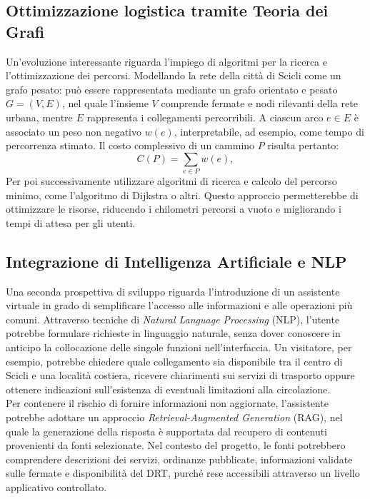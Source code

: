 \subsection*{Ottimizzazione logistica tramite Teoria dei Grafi}
Un'evoluzione interessante riguarda l'impiego di algoritmi per la ricerca e l'ottimizzazione dei percorsi. Modellando la rete della città di Scicli come un grafo pesato: può essere rappresentata mediante un grafo orientato e pesato $G=(V,E)$, nel quale l'insieme $V$ comprende fermate e nodi rilevanti della rete urbana, mentre $E$ rappresenta i collegamenti percorribili. A ciascun arco $e\in E$ è associato un peso non negativo $w(e)$, interpretabile, ad esempio, come tempo di percorrenza stimato. Il costo complessivo di un cammino $P$ risulta pertanto:
\begin{equation}
    C(P)=\sum_{e\in P} w(e),
    \label{eq:costo_percorso}
\end{equation}
\vspace{1em}
Per poi successivamente utilizzare algoritmi di ricerca e calcolo del percorso minimo, come l'algoritmo di Dijkstra o altri. Questo approccio permetterebbe di ottimizzare le risorse, riducendo i chilometri percorsi a vuoto e migliorando i tempi di attesa per gli utenti.

\subsection*{Integrazione di Intelligenza Artificiale e NLP}
Una seconda prospettiva di sviluppo riguarda l'introduzione di un assistente virtuale in grado di semplificare l'accesso alle informazioni e alle operazioni più comuni. Attraverso tecniche di \emph{Natural Language Processing} (NLP), l'utente potrebbe formulare richieste in linguaggio naturale, senza dover conoscere in anticipo la collocazione delle singole funzioni nell'interfaccia. 
Un visitatore, per esempio, potrebbe chiedere quale collegamento sia disponibile tra il centro di Scicli e una località costiera, ricevere chiarimenti sui servizi di trasporto oppure ottenere indicazioni sull'esistenza di eventuali limitazioni alla circolazione.
\\
Per contenere il rischio di fornire informazioni non aggiornate, l'assistente potrebbe adottare un approccio \emph{Retrieval-Augmented Generation} (RAG), nel quale la generazione della risposta è supportata dal recupero di contenuti provenienti da fonti selezionate. Nel contesto del progetto, le fonti potrebbero comprendere descrizioni dei servizi, ordinanze pubblicate, informazioni validate sulle fermate e disponibilità del DRT, purché rese accessibili attraverso un livello applicativo controllato. 

